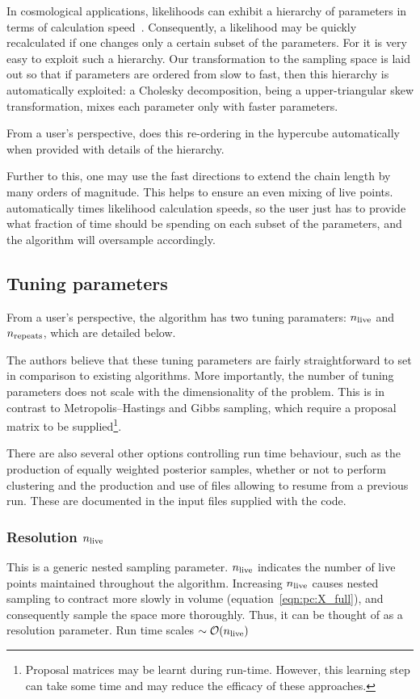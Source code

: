 In cosmological applications, likelihoods can exhibit a hierarchy of parameters in terms of calculation speed~\citep{LewisFastSlow}. Consequently, a likelihood may be quickly recalculated if one changes only a certain subset of the parameters. For \PolyChord{} it is very easy to exploit such a hierarchy. Our transformation to the sampling space is laid out so that if parameters are ordered from slow to fast, then this hierarchy is automatically exploited: a Cholesky decomposition, being a upper-triangular skew transformation, mixes each parameter only with faster parameters.

From a user's perspective, \PolyChord{} does this re-ordering in the hypercube automatically when provided with details of the hierarchy.

Further to this, one may use the fast directions to extend the chain length by many orders of magnitude. This helps to ensure an even mixing of live points. \PolyChord{} automatically times likelihood calculation speeds, so the user just has to provide what fraction of time \PolyChord{} should be spending on each subset of the parameters, and the algorithm will oversample accordingly.

\subsection{Tuning parameters}
\label{sec:pc:tuning_params}

From a user's perspective, the \PolyChord{} algorithm has two tuning paramaters: $n_{\mathrm{live}}$ and $n_{\mathrm{repeats}}$, which are detailed below.

The authors believe that these tuning parameters are fairly straightforward to set in comparison to existing algorithms. More importantly, the number of tuning parameters does not scale with the dimensionality of the problem. This is in contrast to Metropolis--Hastings and Gibbs sampling, which require a proposal matrix to be supplied\footnote{Proposal matrices may be learnt during run-time. However, this learning step can take some time and may reduce the efficacy of these approaches.}.

There are also several other options controlling run time behaviour, such as the production of equally weighted posterior samples, whether or not to perform clustering and the production and use of files allowing \PolyChord{} to resume from a previous run. These are documented in the input files supplied with the code.

\subsubsection*{Resolution $n_{\mathrm{live}}$ }
This is a generic nested sampling parameter. $n_{\mathrm{live}}$ indicates the number of live points maintained throughout the algorithm. Increasing $n_{\mathrm{live}}$ causes nested sampling to contract more slowly in volume (equation~\ref{eqn:pc:X_full}), and consequently sample the space more thoroughly. Thus, it can be thought of as a resolution parameter. Run time scales ${\sim\mathcal{O}{\left(n_{\mathrm{live}}\right)}}$

